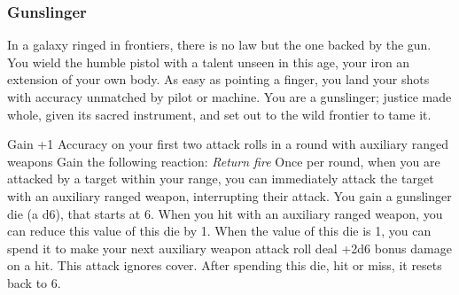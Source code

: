 \subsubsection{Gunslinger}

\begin{talent}
{In a galaxy ringed in frontiers, there is no law but the one backed by the gun. You wield the humble pistol with a talent unseen in this age, your iron an extension of your own body. As easy as pointing a finger, you land your shots with accuracy unmatched by pilot or machine. You are a gunslinger; justice made whole, given its sacred instrument, and set out to the wild frontier to tame it.}

Gain +1 Accuracy on your first two attack rolls in a round with auxiliary ranged weapons
Gain the following reaction:\newline
\textit{Return fire}\newline
\Reaction\newline
Once per round, when you are attacked by a target within your range, you can immediately attack the target with an auxiliary ranged weapon, interrupting their attack. 
You gain a gunslinger die (a d6), that starts at 6. When you hit with an auxiliary ranged weapon, you can reduce this value of this die by 1. When the value of this die is 1, you can spend it to make your next auxiliary weapon attack roll deal +2d6 bonus damage on a hit. This attack ignores cover. After spending this die, hit or miss, it resets back to 6.
\end{talent}